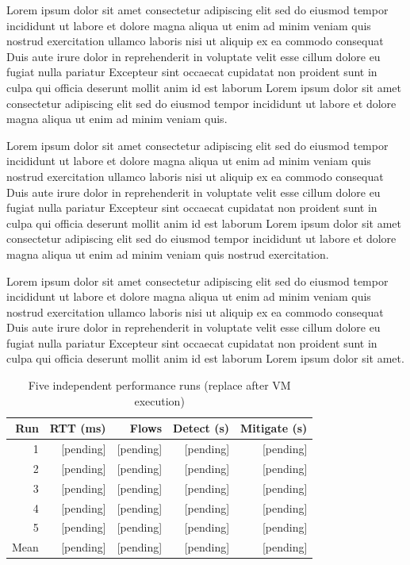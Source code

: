 Lorem ipsum dolor sit amet consectetur adipiscing elit sed do eiusmod tempor incididunt ut labore et dolore magna aliqua ut enim ad minim veniam quis nostrud exercitation ullamco laboris nisi ut aliquip ex ea commodo consequat Duis aute irure dolor in reprehenderit in voluptate velit esse cillum dolore eu fugiat nulla pariatur Excepteur sint occaecat cupidatat non proident sunt in culpa qui officia deserunt mollit anim id est laborum Lorem ipsum dolor sit amet consectetur adipiscing elit sed do eiusmod tempor incididunt ut labore et dolore magna aliqua ut enim ad minim veniam quis.

Lorem ipsum dolor sit amet consectetur adipiscing elit sed do eiusmod tempor incididunt ut labore et dolore magna aliqua ut enim ad minim veniam quis nostrud exercitation ullamco laboris nisi ut aliquip ex ea commodo consequat Duis aute irure dolor in reprehenderit in voluptate velit esse cillum dolore eu fugiat nulla pariatur Excepteur sint occaecat cupidatat non proident sunt in culpa qui officia deserunt mollit anim id est laborum Lorem ipsum dolor sit amet consectetur adipiscing elit sed do eiusmod tempor incididunt ut labore et dolore magna aliqua ut enim ad minim veniam quis nostrud exercitation.

Lorem ipsum dolor sit amet consectetur adipiscing elit sed do eiusmod tempor incididunt ut labore et dolore magna aliqua ut enim ad minim veniam quis nostrud exercitation ullamco laboris nisi ut aliquip ex ea commodo consequat Duis aute irure dolor in reprehenderit in voluptate velit esse cillum dolore eu fugiat nulla pariatur Excepteur sint occaecat cupidatat non proident sunt in culpa qui officia deserunt mollit anim id est laborum Lorem ipsum dolor sit amet.

\begin{table}[t]
\caption{Five independent performance runs (replace after VM execution)}
\label{tab:results}
\centering\scriptsize
\begin{tabular}{rrrrr}
\toprule
Run & RTT (ms) & Flows & Detect (s) & Mitigate (s) \\
\midrule
1 & [pending] & [pending] & [pending] & [pending] \\
2 & [pending] & [pending] & [pending] & [pending] \\
3 & [pending] & [pending] & [pending] & [pending] \\
4 & [pending] & [pending] & [pending] & [pending] \\
5 & [pending] & [pending] & [pending] & [pending] \\
Mean & [pending] & [pending] & [pending] & [pending] \\
\bottomrule
\end{tabular}
\end{table}

